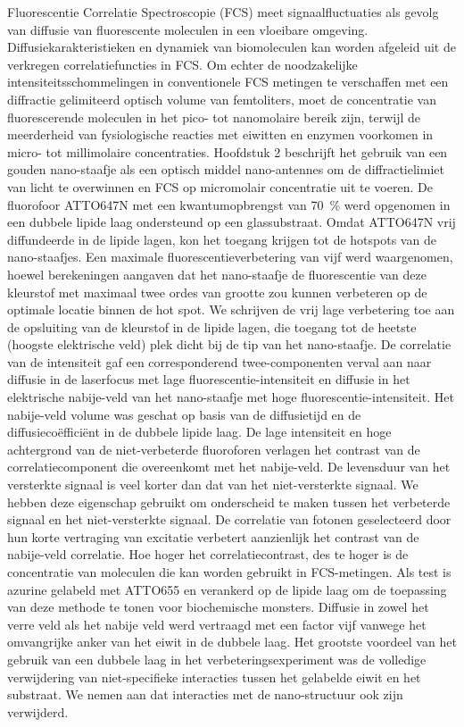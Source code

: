 Fluorescentie Correlatie Spectroscopie (FCS) meet signaalfluctuaties als gevolg van diffusie van fluorescente moleculen in een vloeibare omgeving. Diffusiekarakteristieken en dynamiek van biomoleculen kan worden afgeleid uit de verkregen correlatiefuncties in FCS. Om echter de noodzakelijke intensiteitsschommelingen in conventionele FCS metingen te verschaffen met een diffractie gelimiteerd optisch volume van femtoliters, moet de concentratie
van fluorescerende moleculen in het pico- tot nanomolaire bereik zijn, terwijl de meerderheid van fysiologische reacties met eiwitten en enzymen voorkomen in micro- tot millimolaire concentraties.  Hoofdstuk 2 beschrijft het gebruik van een gouden nano-staafje als een optisch middel nano-antennes om de diffractielimiet van licht te overwinnen en FCS op micromolair concentratie uit te voeren. De fluorofoor ATTO647N met een kwantumopbrengst van \SI{70}{\percent} werd opgenomen in een dubbele lipide laag ondersteund op een glassubstraat. Omdat ATTO647N vrij diffundeerde in de lipide lagen, kon het toegang krijgen tot de hotspots van de nano-staafjes. Een maximale fluorescentieverbetering van vijf werd waargenomen, hoewel berekeningen aangaven dat het nano-staafje de fluorescentie van deze kleurstof met maximaal twee ordes van grootte zou kunnen verbeteren op de optimale locatie binnen de hot spot. We schrijven de vrij lage verbetering toe aan de opsluiting van de kleurstof in de lipide lagen, die toegang tot de heetste (hoogste elektrische veld) plek dicht bij de tip van het nano-staafje. De correlatie van de intensiteit gaf een corresponderend twee-componenten verval aan naar diffusie in de laserfocus met lage fluorescentie-intensiteit en diffusie in het  elektrische nabije-veld van het nano-staafje met hoge fluorescentie-intensiteit. Het nabije-veld volume was geschat op basis van de diffusietijd en de diffusiecoëfficiënt in de dubbele lipide laag. De lage intensiteit en hoge achtergrond van de niet-verbeterde fluoroforen verlagen het contrast van de correlatiecomponent die overeenkomt met het nabije-veld. De levensduur van het versterkte signaal is veel korter dan dat van het niet-versterkte signaal. We hebben deze eigenschap gebruikt om onderscheid te maken tussen het verbeterde signaal en het niet-versterkte signaal. De correlatie van fotonen geselecteerd door hun korte vertraging van excitatie verbetert aanzienlijk het contrast van de nabije-veld correlatie. Hoe hoger het correlatiecontrast, des te hoger is de concentratie van moleculen die kan worden gebruikt in FCS-metingen. Als test is azurine gelabeld met ATTO655 en verankerd op de lipide laag om de toepassing van deze methode te tonen voor biochemische monsters. Diffusie in zowel het verre veld als het nabije veld werd vertraagd met een factor vijf vanwege het omvangrijke anker van het eiwit in de dubbele laag. Het grootste voordeel van het gebruik van een dubbele laag in het verbeteringsexperiment was de volledige verwijdering van niet-specifieke interacties tussen het gelabelde eiwit en het substraat. We nemen aan dat interacties met de nano-structuur ook zijn verwijderd.


